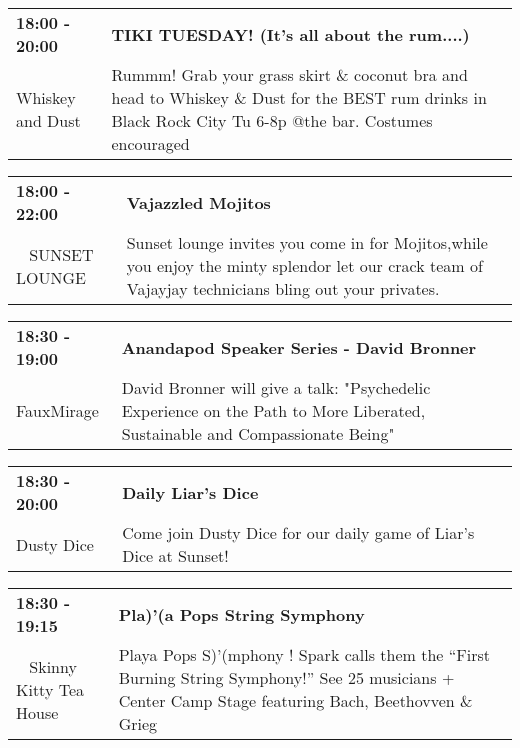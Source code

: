 \begin{tabular}{ p{1in} p{2.2in} }
    \textbf{18:00 - 20:00} & \textbf{TIKI TUESDAY! (It's all about the rum....)} \\
    Whiskey and Dust \newline  & Rummm! Grab your grass skirt \& coconut bra and head to Whiskey \& Dust for the BEST rum drinks in Black Rock City Tu 6-8p @the bar. Costumes encouraged \\
    \hline 
\end{tabular}
    
\begin{tabular}{ p{1in} p{2.2in} }
    \textbf{18:00 - 22:00} & \textbf{Vajazzled Mojitos} \\
    ~ \newline SUNSET LOUNGE & Sunset lounge invites you come in for Mojitos,while you enjoy the minty splendor let our crack team of Vajayjay technicians bling out your privates. \\
    \hline 
\end{tabular}
    
\begin{tabular}{ p{1in} p{2.2in} }
    \textbf{18:30 - 19:00} & \textbf{Anandapod Speaker Series - David Bronner} \\
    FauxMirage \newline  & David Bronner will give a talk: "Psychedelic Experience on the Path to More Liberated, Sustainable and Compassionate Being" \\
    \hline 
\end{tabular}
    
\begin{tabular}{ p{1in} p{2.2in} }
    \textbf{18:30 - 20:00} & \textbf{Daily Liar's Dice} \\
    Dusty Dice \newline  & Come join Dusty Dice for our daily game of Liar's Dice at Sunset! \\
    \hline 
\end{tabular}
    
\begin{tabular}{ p{1in} p{2.2in} }
    \textbf{18:30 - 19:15} & \textbf{Pla)'(a Pops String Symphony} \\
    ~ \newline Skinny Kitty Tea House & Playa Pops S)'(mphony ! Spark calls them the ``First Burning String Symphony!'' See 25 musicians + Center Camp Stage featuring Bach, Beethovven \& Grieg \\
    \hline 
\end{tabular}
    
